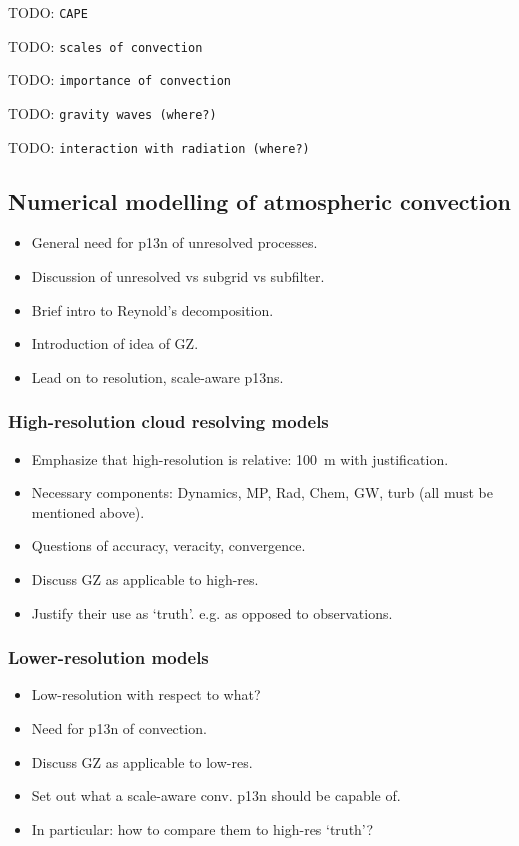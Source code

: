 \documentclass[11pt,a4paper]{article}
\newcommand{\todo}{TODO: \texttt}
\begin{document}
\todo{CAPE}

\todo{scales of convection}

\todo{importance of convection}

\todo{gravity waves (where?)}

\todo{interaction with radiation (where?)}

\subsection{Numerical modelling of atmospheric convection}

\begin{itemize}
    \item General need for p13n of unresolved processes.
    \item Discussion of unresolved vs subgrid vs subfilter.
    \item Brief intro to Reynold's decomposition.
    \item Introduction of idea of GZ.
    \item Lead on to resolution, scale-aware p13ns.
\end{itemize}

\subsubsection{High-resolution cloud resolving models}

\begin{itemize}
    \item Emphasize that high-resolution is relative: \SI{100}{m} with justification.
    \item Necessary components: Dynamics, MP, Rad, Chem, GW, turb (all must be mentioned above).
    \item Questions of accuracy, veracity, convergence.
    \item Discuss GZ as applicable to high-res.
    \item Justify their use as `truth'. e.g. as opposed to observations.
\end{itemize}

\subsubsection{Lower-resolution models}

\begin{itemize}
    \item Low-resolution with respect to what?
    \item Need for p13n of convection.
    \item Discuss GZ as applicable to low-res.
    \item Set out what a scale-aware conv. p13n should be capable of.
    \item In particular: how to compare them to high-res `truth'?
\end{itemize}
\end{document}
